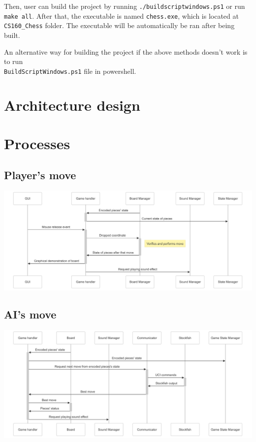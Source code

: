 \documentclass[a4paper, 10pt, titlepage]{report}
\begin{document}
Then, user can build the project by running \texttt{./buildscriptwindows.ps1} or run \texttt{make all}. After that, the executable is named \texttt{chess.exe}, which is located at \texttt{CS160\_Chess} folder. The executable will be automatically be ran after being built.

An alternative way for building the project if the above methods doesn't work is to run \\ \texttt{BuildScriptWindows.ps1} file in powershell. 

\section{Architecture design}


\section{Processes}
\subsection{Player's move}
\includegraphics[width = \linewidth]{MOve diagram.png}
\subsection{AI's move}
\includegraphics[width = \linewidth]{AI move.png}
\end{document}
